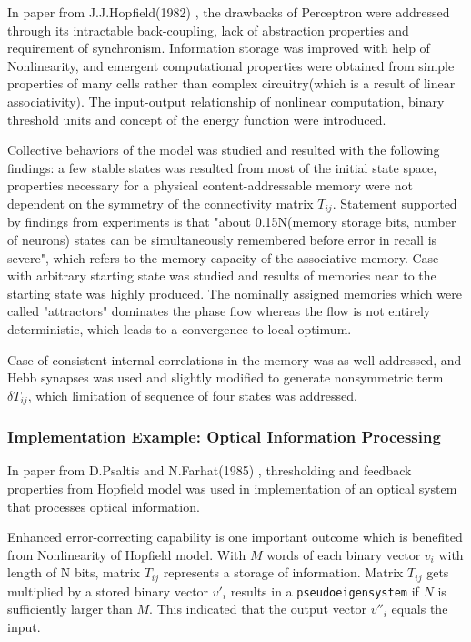 \documentclass[12pt, a4paper]{article}
\begin{document}
In paper from J.J.Hopfield(1982) \cite{computational_abilities}, the drawbacks of Perceptron were addressed through its intractable back-coupling, lack of abstraction properties and requirement of synchronism. Information storage was improved with help of Nonlinearity, and emergent computational properties were obtained from simple properties of many cells rather than complex circuitry(which is a result of linear associativity). The input-output relationship of nonlinear computation, binary threshold units and concept of the energy function were introduced.

Collective behaviors of the model was studied and resulted with the following findings: a few stable states was resulted from most of the initial state space, properties necessary for a physical content-addressable memory were not dependent on the symmetry of the connectivity matrix $T_{ij}$. Statement supported by findings from experiments is that "about 0.15N(memory storage bits, number of neurons) states can be simultaneously remembered before error in recall is severe", which refers to the memory capacity of the associative memory. Case with arbitrary starting state was studied and results of memories near to the starting state was highly produced. The nominally assigned memories which were called "attractors" dominates the phase flow whereas the flow is not entirely deterministic, which leads to a convergence to local optimum.

Case of consistent internal correlations in the memory was as well addressed, and Hebb synapses was used and slightly modified to generate nonsymmetric term~$\delta T_{ij}$, which limitation of sequence of four states was addressed.

\subsubsection{Implementation Example: Optical Information Processing}
In paper from D.Psaltis and N.Farhat(1985) \cite{optical_processing}, thresholding and feedback properties from Hopfield model was used in implementation of an optical system that processes optical information.

Enhanced error-correcting capability is one important outcome which is benefited from Nonlinearity of Hopfield model. With $M$ words of each binary vector $v_i$ with length of N bits, matrix $T_{ij}$ represents a storage of information. Matrix $T_{ij}$ gets multiplied by a stored binary vector $v'_i$ results in a \texttt{pseudoeigensystem} if $N$ is sufficiently larger than $M$. This indicated that the output vector $v''_i$ equals the input.
\end{document}
